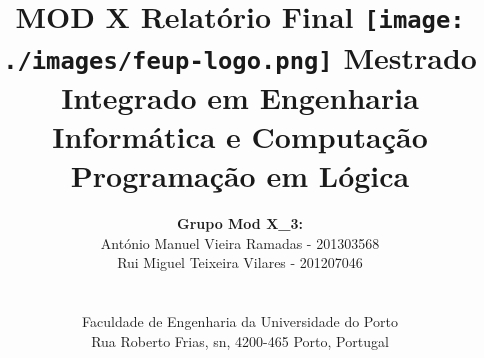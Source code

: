 \documentclass[a4paper]{article}
\begin{document}
\setlength{\textwidth}{16cm}
\setlength{\textheight}{22cm}

\title{\Huge\textbf{MOD X}\linebreak\linebreak\linebreak
\Large\textbf{Relatório Final}\linebreak\linebreak
\linebreak\linebreak
\texttt{[image: ./images/feup-logo.png]}\linebreak\linebreak
\linebreak\linebreak
\Large{Mestrado Integrado em Engenharia Informática e Computação} \linebreak\linebreak
\Large{Programação em Lógica}\linebreak
}

\author{\textbf{Grupo Mod X\_3:}\\
António Manuel Vieira Ramadas - 201303568 \\
Rui Miguel Teixeira Vilares - 201207046 \\
\linebreak\linebreak \\
 \\ Faculdade de Engenharia da Universidade do Porto \\ Rua Roberto Frias, s\/n, 4200-465 Porto, Portugal \linebreak\linebreak\linebreak
\linebreak\linebreak\vspace{1cm}}

\maketitle
\thispagestyle{empty}


\newpage
\end{document}

